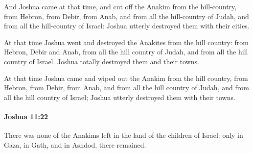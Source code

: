 			\begin{versebox}
					\item[BHS] 
					\item[ASV] And Joshua came at that time, and cut off the Anakim from the hill-country, from Hebron, from Debir, from Anab, and from all the hill-country of Judah, and from all the hill-country of Israel: Joshua utterly destroyed them with their cities.
					\item[NIV] At that time Joshua went and destroyed the Anakites from the hill country: from Hebron, Debir and Anab, from all the hill country of Judah, and from all the hill country of Israel. Joshua totally destroyed them and their towns.
					\item[NRSV] At that time Joshua came and wiped out the Anakim from the hill country, from Hebron, from Debir, from Anab, and from all the hill country of Judah, and from all the hill country of Israel; Joshua utterly destroyed them with their towns.
			\end{versebox}

		\paragraph{Joshua 11:22} %
			\label{JOSHUA-11-22}

			There was none of the Anakims left in the land of the children of Israel: only in Gaza, in Gath, and in Ashdod, there remained.

